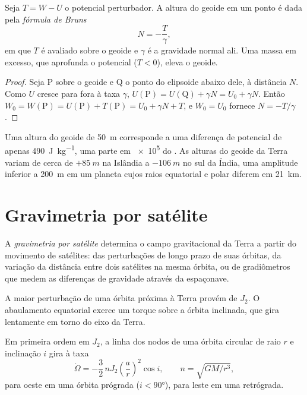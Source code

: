 \begin{proposition}\label{prop:b3:gravity-geodesy:bruns}
Seja $T = W - U$ o potencial perturbador. A altura do geoide em um ponto é
dada pela \emph{fórmula de Bruns}
\[
  N = -\frac{T}{\gamma},
\]
em que $T$ é avaliado sobre o geoide e $\gamma$ é a gravidade normal ali. Uma
massa em excesso, que aprofunda o potencial ($T < 0$), eleva o geoide.
\end{proposition}

\begin{proof}
Seja P sobre o geoide e Q o ponto do elipsoide abaixo dele, à distância
$N$. Como $U$ cresce para fora à taxa $\gamma$,
$U(\mathrm P) = U(\mathrm Q) + \gamma N = U_0 + \gamma N$. Então
$W_0 = W(\mathrm P) = U(\mathrm P) + T(\mathrm P) = U_0 + \gamma N + T$, e
$W_0 = U_0$ fornece $N = -T/\gamma$.
\end{proof}

Uma altura do geoide de \qty{50}{m} corresponde a uma diferença de potencial de apenas
\qty{490}{J.kg^{-1}}, uma parte em \num{e5} do . As alturas do geoide
da Terra variam de cerca de $+\qty{85}{m}$ na Islândia a
$-\qty{106}{m}$ no sul da Índia,
uma amplitude inferior a \qty{200}{m} em um planeta cujos raios equatorial e polar
diferem em \qty{21}{km}.

\section{Gravimetria por satélite}

\begin{definition}\label{def:b3:gravity-geodesy:satgrav}
A \emph{gravimetria por satélite} determina o campo gravitacional da Terra
a partir do movimento de satélites: das perturbações de longo prazo
de suas órbitas, da variação da distância entre dois satélites na mesma
órbita, ou de gradiômetros que medem as diferenças de gravidade através da
espaçonave.
\end{definition}

A maior perturbação de uma órbita próxima à Terra provém de $J_2$. O
abaulamento equatorial exerce um torque sobre a órbita inclinada, que gira lentamente
em torno do eixo da Terra.

\begin{proposition}\label{prop:b3:gravity-geodesy:nodal}
Em primeira ordem em $J_2$, a linha dos nodos de uma órbita circular de raio $r$ e
inclinação $i$ gira à taxa
\[
  \dot\Omega = -\frac32\,nJ_2\left(\frac ar\right)^2\cos i,\qquad n = \sqrt{GM/r^3} ,
\]
para oeste em uma órbita prógrada ($i < \ang{90}$), para leste em uma retrógrada.
\end{proposition}

